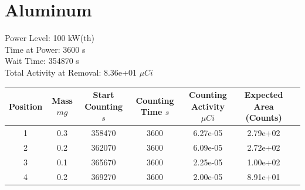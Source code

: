 \newpage

\section*{ Aluminum }

Power Level: 100 kW(th) \\
Time at Power: 3600 s \\
Wait Time: 354870 s \\
Total Activity at Removal: 8.36e+01 $\mu Ci$

\begin{table}[h]
\centering
\begin{tabular}{ |c|c|c|c|c|c|c| }
 \hline
 Position & Mass $mg$ & Start Counting $s$ & Counting Time $s$ & Counting Activity $\mu Ci$ & Expected Area (Counts) \\
 \hline 
 1 & 0.3 & 358470 & 3600 & 6.27e-05 & 2.79e+02\\ 
\hline
 2 & 0.2 & 362070 & 3600 & 6.09e-05 & 2.72e+02\\ 
\hline
 3 & 0.1 & 365670 & 3600 & 2.25e-05 & 1.00e+02\\ 
\hline
 4 & 0.2 & 369270 & 3600 & 2.00e-05 & 8.91e+01\\ 
\hline
\end{tabular}
\end{table}


